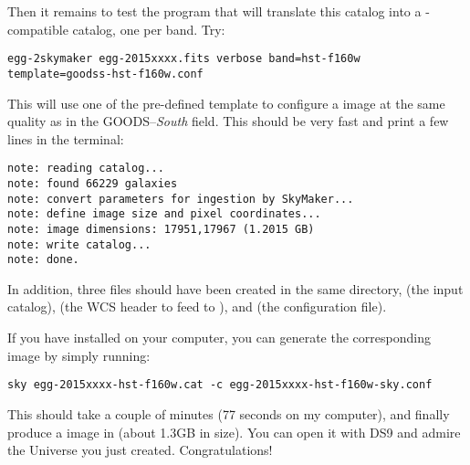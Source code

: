 Then it remains to test the program that will translate this catalog into a \skymaker-compatible catalog, one per band. Try:
\begin{verbatim}
egg-2skymaker egg-2015xxxx.fits verbose band=hst-f160w template=goodss-hst-f160w.conf
\end{verbatim}
This will use one of the pre-defined \skymaker template to configure a \hubble image at the same quality as in the GOODS--{\it South} field. This should be very fast and print a few lines in the terminal:
\begin{verbatim}
note: reading catalog...
note: found 66229 galaxies
note: convert parameters for ingestion by SkyMaker...
note: define image size and pixel coordinates...
note: image dimensions: 17951,17967 (1.2015 GB)
note: write catalog...
note: done.
\end{verbatim}
In addition, three files should have been created in the same directory,  (the \skymaker input catalog),  (the WCS header to feed to \skymaker), and  (the \skymaker configuration file).

If you have \skymaker installed on your computer, you can generate the corresponding image by simply running:
\begin{verbatim}
sky egg-2015xxxx-hst-f160w.cat -c egg-2015xxxx-hst-f160w-sky.conf
\end{verbatim}

This should take a couple of minutes (77 seconds on my computer), and finally produce a \hubble image in  (about 1.3GB in size). You can open it with DS9 and admire the Universe you just created. Congratulations!
